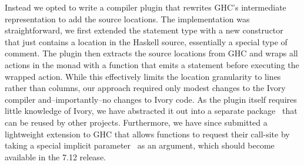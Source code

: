 Instead we opted to write a compiler plugin that rewrites GHC's intermediate
representation to add the source locations. The implementation was
straightforward, we first extended the  statement type with a new
 constructor that just contains a location in the Haskell source,
essentially a special type of comment. The plugin then extracts the source
locations from GHC and wraps all actions in the  monad with a
 function that emits a  statement before executing
the wrapped action. While this effectively limits the location granularity to
lines rather than columns, our approach required only modest changes to the
Ivory compiler and--importantly--no changes to Ivory code. As the plugin
itself requires little knowledge of Ivory, we have abstracted it out into a
separate package~\cite{ghc-srcspan-plugin} that can be reused by other projects.
Furthermore, we have since submitted a lightweight extension to GHC that allows
functions to request their call-site by taking a special implicit
parameter~\cite{lewis2000implicit} as an argument, which should become available
in the 7.12 release.

